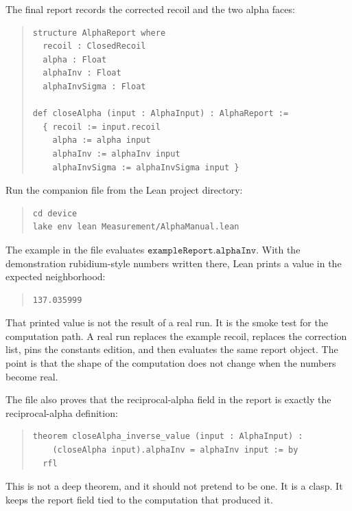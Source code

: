 The final report records the corrected recoil and the two alpha faces:

\begin{quote}\small
\begin{verbatim}
structure AlphaReport where
  recoil : ClosedRecoil
  alpha : Float
  alphaInv : Float
  alphaInvSigma : Float

def closeAlpha (input : AlphaInput) : AlphaReport :=
  { recoil := input.recoil
    alpha := alpha input
    alphaInv := alphaInv input
    alphaInvSigma := alphaInvSigma input }
\end{verbatim}
\end{quote}

Run the companion file from the Lean project directory:

\begin{quote}\small
\begin{verbatim}
cd device
lake env lean Measurement/AlphaManual.lean
\end{verbatim}
\end{quote}

The example in the file evaluates \(\texttt{exampleReport.alphaInv}\). With the demonstration rubidium-style
numbers written there, Lean prints a value in the expected neighborhood:

\begin{quote}\small
\begin{verbatim}
137.035999
\end{verbatim}
\end{quote}

That printed value is not the result of a real run. It is the smoke test for the computation path. A real run
replaces the example recoil, replaces the correction list, pins the constants edition, and then evaluates the
same report object. The point is that the shape of the computation does not change when the numbers become real.

The file also proves that the reciprocal-alpha field in the report is exactly the reciprocal-alpha definition:

\begin{quote}\small
\begin{verbatim}
theorem closeAlpha_inverse_value (input : AlphaInput) :
    (closeAlpha input).alphaInv = alphaInv input := by
  rfl
\end{verbatim}
\end{quote}

This is not a deep theorem, and it should not pretend to be one. It is a clasp. It keeps the report field tied to
the computation that produced it.

